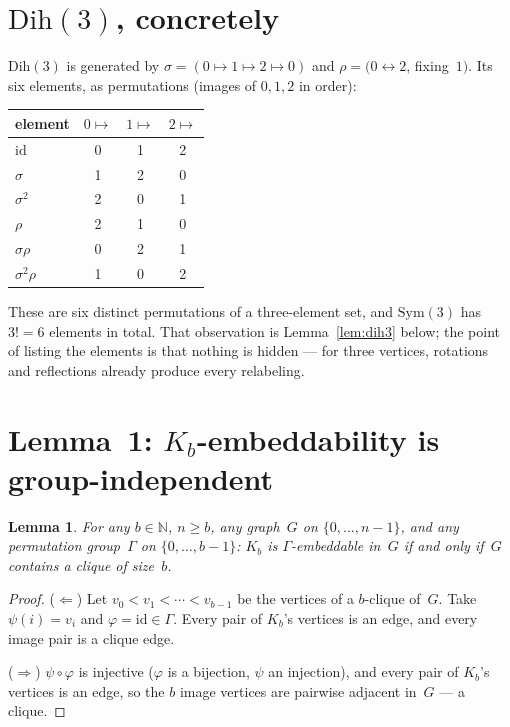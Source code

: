 \documentclass[11pt]{article}
\newtheorem{lemma}[theorem]{Lemma}
\theoremstyle{definition}
\newcommand{\Dih}{\mathrm{Dih}}
\newcommand{\Sym}{\mathrm{Sym}}
\begin{document}
\section{$\Dih(3)$, concretely}

$\Dih(3)$ is generated by $\sigma = (0 \mapsto 1 \mapsto 2 \mapsto 0)$ and
$\rho = (0 \leftrightarrow 2$, fixing~$1)$. Its six elements, as permutations
(images of $0, 1, 2$ in order):

\medskip
\begin{center}
\begin{tabular}{@{}lccc@{}}
\toprule
element & $0 \mapsto$ & $1 \mapsto$ & $2 \mapsto$ \\
\midrule
$\mathrm{id}$ & 0 & 1 & 2 \\
$\sigma$      & 1 & 2 & 0 \\
$\sigma^2$    & 2 & 0 & 1 \\
$\rho$        & 2 & 1 & 0 \\
$\sigma\rho$  & 0 & 2 & 1 \\
$\sigma^2\rho$& 1 & 0 & 2 \\
\bottomrule
\end{tabular}
\end{center}

\medskip
These are six distinct permutations of a three-element set, and $\Sym(3)$ has
$3! = 6$ elements in total. That observation is Lemma~\ref{lem:dih3} below; the
point of listing the elements is that nothing is hidden --- for three vertices,
rotations and reflections already produce every relabeling.

\section{Lemma~1: $K_b$-embeddability is group-independent}

\begin{lemma}\label{lem:kb}
For any $b \in \mathbb{N}$, $n \ge b$, any graph~$G$ on $\{0, \ldots, n-1\}$,
and any permutation group~$\Gamma$ on $\{0, \ldots, b-1\}$: $K_b$ is
$\Gamma$-embeddable in~$G$ if and only if~$G$ contains a clique of size~$b$.
\end{lemma}

\begin{proof}
($\Leftarrow$) Let $v_0 < v_1 < \cdots < v_{b-1}$ be the vertices of a
$b$-clique of~$G$. Take $\psi(i) = v_i$ and $\varphi = \mathrm{id} \in \Gamma$.
Every pair of $K_b$'s vertices is an edge, and every image pair is a clique edge.

($\Rightarrow$) $\psi \circ \varphi$ is injective ($\varphi$ is a bijection,
$\psi$ an injection), and every pair of $K_b$'s vertices is an edge, so the $b$
image vertices are pairwise adjacent in~$G$ --- a clique.
\end{proof}
\end{document}

